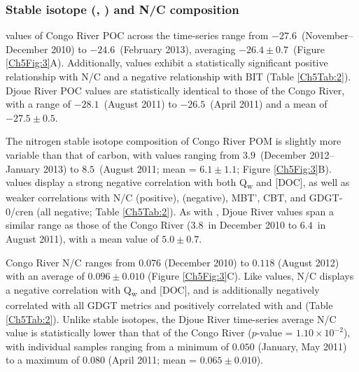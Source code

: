 \subsubsection{Stable isotope (, ) and N/C composition}

 values of Congo River POC across the time-series range from $-27.6$\textperthousand\ (November--December 2010) to $-24.6$\textperthousand\ (February 2013), averaging $-26.4 \pm 0.7$\textperthousand\ (Figure \ref{Ch5Fig:3}A). Additionally,  values exhibit a statistically significant positive relationship with N/C and a negative relationship with BIT (Table \ref{Ch5Tab:2}). Djoue River POC  values are statistically identical to those of the Congo River, with a range of $-28.1$\textperthousand\ (August 2011) to $-26.5$\textperthousand\ (April 2011) and a mean of $-27.5 \pm 0.5$\textperthousand.

The nitrogen stable isotope composition of Congo River POM is slightly more variable than that of carbon, with  values ranging from $3.9$\textperthousand\ (December 2012--January 2013) to $8.5$\textperthousand\ (August 2011; mean = $6.1 \pm 1.1$\textperthousand; Figure \ref{Ch5Fig:3}B).  values display a strong negative correlation with both Q\textsubscript{w} and [DOC], as well as weaker correlations with N/C (positive),  (negative), MBT', CBT, and GDGT-0/cren (all negative; Table \ref{Ch5Tab:2}). As with , Djoue River  values span a similar range as those of the Congo River ($3.8$\textperthousand\ in December 2010 to $6.4$\textperthousand\ in August 2011), with a mean value of $5.0 \pm 0.7$\textperthousand.

Congo River N/C ranges from $0.076$ (December 2010) to $0.118$ (August 2012) with an average of $0.096 \pm 0.010$ (Figure \ref{Ch5Fig:3}C). Like  values, N/C displays a negative correlation with Q\textsubscript{w} and [DOC], and is additionally negatively correlated with all GDGT metrics and positively correlated with  and  (Table \ref{Ch5Tab:2}). Unlike stable isotopes, the Djoue River time-series average N/C value is statistically lower than that of the Congo River ($p$-value = $1.10 \times 10^{-2}$), with individual samples ranging from a minimum of $0.050$ (January, May 2011) to a maximum of $0.080$ (April 2011; mean = $0.065 \pm 0.010$).

